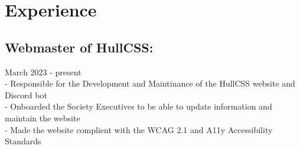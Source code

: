 \section{Experience}

\subsection{Webmaster of HullCSS:} March 2023 - present \\
\:-\: Responsible for the Development and Maintinance of the HullCSS website and Discord bot \\
\:-\: Onboarded the Society Executives to be able to update information and maintain the website \\
\:-\: Made the website complient with the WCAG 2.1 and A11y Accessibility Standards 